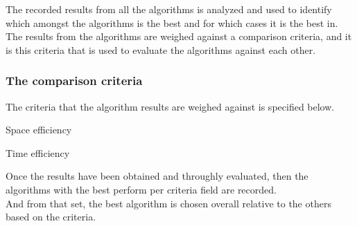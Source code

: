 The recorded results from all the algorithms is analyzed and used to identify which amongst the algorithms is the best and for which cases it is the best in.\\
The results from the algorithms are weighed against a comparison criteria, and it is this criteria that is used to evaluate the algorithms against each other.\\

\subsubsection{The comparison criteria}
The criteria that the algorithm results are weighed against is specified below.
\begin{myEnumerate}
	\item Space efficiency
	\item Time efficiency
 \end{myEnumerate}
 \break
 
Once the results have been obtained and throughly evaluated, then the algorithms with the best perform per criteria field are recorded.\\
And from that set, the best algorithm is chosen overall relative to the others based on the criteria.